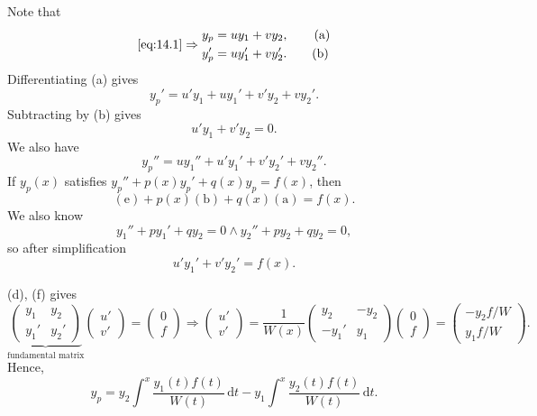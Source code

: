 \documentclass[10pt]{article}
\def\f{{\mathrm f}}
\begin{document}
    Note that
    \[
        \ref{eq:14.1}  \Rightarrow  
        \begin{aligned}
            y_p&=uy_1+vy_2,\qquad (\text{a})\\
            y_p'&=uy_1'+vy_2'.\qquad (\text{b})    
        \end{aligned}
    \]
    Differentiating (a) gives 
    \[
        y_p'=u'y_1+uy_1'+v'y_2+vy_2'\tag{c}
    .\]
    Subtracting by (b) gives 
    \[
        \boxed{u'y_1+v'y_2=0}\tag{d}
    .\]
    We also have 
    \[
        y_p''=uy_1''+u'y_1'+v'y_2'+vy_2''\tag{e}
    .\]
    If $ y_p(x) $ satisfies $ y_p''+p(x)y_p'+q(x)y_p=f(x) $, then 
    \[
        (\text{e})+p(x)(\text{b})+q(x)(\text{a})=f(x)
    .\]
    We also know 
    \[
        y_1''+py_1'+qy_2=0\land y_2''+py_2+qy_2=0,
    \]
    so after simplification
    \[
       \boxed{ u'y_1'+v'y_2'=f(x)}\tag{f}
    .\]

    (d), (f) gives 
    \[
        \underbrace{\begin{pmatrix}
            y_1&y_2\\
            y_1'&y_2'
        \end{pmatrix}}_{\text{fundamental matrix}}
        \begin{pmatrix}
            u'\\v'
        \end{pmatrix}
        =
        \begin{pmatrix}
            0\\f
        \end{pmatrix}
        \Longrightarrow 
        \begin{pmatrix}
            u'\\v'
        \end{pmatrix}=
        \frac{1}{W(x)}\begin{pmatrix}
            y_2&-y_2\\
            -y_1'&y_1
        \end{pmatrix}
        \begin{pmatrix}
            0\\f
        \end{pmatrix}
        =\begin{pmatrix}
            -y_2f/W\\ y_1f/W
        \end{pmatrix}
    .\]
    Hence, 
    \[
        \boxed{y_p = y_2 \int^{x} \frac{y_1(t)f(t)}{W(t)} \,\mathrm{d}t-y_1 \int^{x} \frac{y_2(t)f(t)}{W(t)} \,\mathrm{d}t}
    .\]
\end{document}
